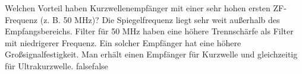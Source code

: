     {Welchen Vorteil haben Kurzwellenempfänger mit einer sehr hohen ersten ZF-Frequenz (z. B. 50 MHz)?}
    {Die Spiegelfrequenz liegt sehr weit außerhalb des Empfangsbereichs.}
    {Filter für 50 MHz haben eine höhere Trennschärfe als Filter mit niedrigerer Frequenz.}
    {Ein solcher Empfänger hat eine höhere Großsignalfestigkeit.}
    {Man erhält einen Empfänger für Kurzwelle und gleichzeitig für Ultrakurzwelle.}
    {false}{false}